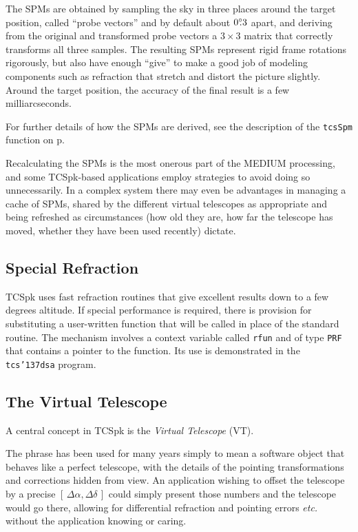 \documentclass[12pt,fleqn,twoside]{article}
\renewcommand{\_}{{\tt\char'137}}     %
\newcommand{\degree}[2] {$#1^{\circ}
                        \hspace{-0.35em}.\hspace{0.04em}#2$}
\begin{document}
The SPMs are obtained by sampling the sky in three places around the
target position, called ``probe vectors'' and
by default about \degree{0}{3} apart, and deriving
from the original and transformed probe vectors
a $3\times3$ matrix that correctly transforms all three samples.
The resulting
SPMs represent rigid
frame rotations rigorously, but also have enough ``give''
to make a good job of modeling components such as refraction
that stretch and distort the picture slightly.  Around
the target position, the accuracy of the final result
is a few milliarcseconds.

\ifx\vdoc\vfull
For further details of how the SPMs are derived, see the description of
the {\tt tcsSpm} function on p\pageref{tcsSpm}.
\fi

Recalculating the SPMs is the most onerous
part of the MEDIUM processing, and some TCSpk-based
applications employ strategies to avoid doing so
unnecessarily.  In a complex system there may even be
advantages in managing a
cache of SPMs, shared by the different virtual telescopes as
appropriate and being refreshed as circumstances (how old they are,
how far the telescope has moved, whether they have been used
recently) dictate.

\subsection{Special Refraction}

TCSpk uses fast refraction routines that give excellent results down to
a few degrees altitude. If special performance is required, there is
provision for substituting a user-written function that will be
called in place of the standard routine.  The mechanism involves
a context variable called {\tt rfun} and of type {\tt PRF} that
contains a pointer to the function.  Its use is demonstrated in
the {\tt tcs\_dsa} program.

\subsection{The Virtual Telescope}

A central concept in TCSpk is the {\it Virtual Telescope} (VT).

The phrase has been used for many years simply to mean a software
object that behaves like a perfect telescope, with the details of
the pointing transformations and corrections hidden from view.  An
application wishing to offset the telescope by a precise
$[\,\Delta\alpha,\Delta\delta\,]$ could simply present those
numbers and the telescope would go there, allowing for differential
refraction and pointing errors {\it etc.} without the application
knowing or caring.
\end{document}
